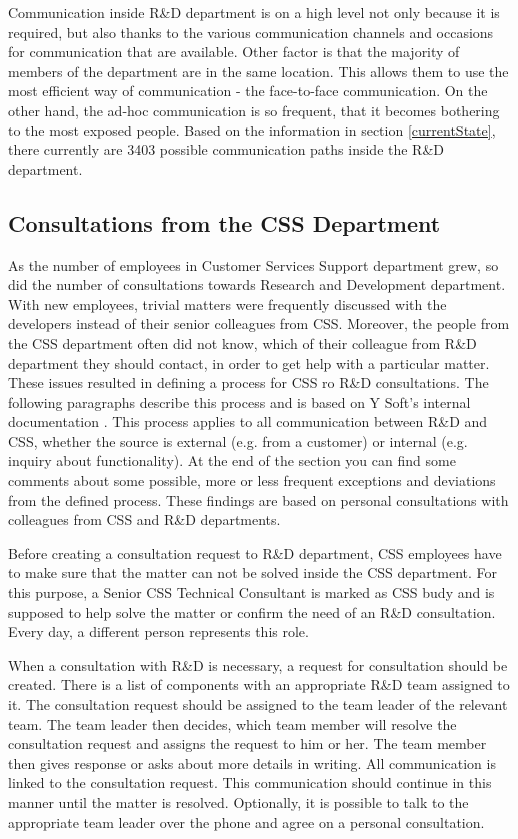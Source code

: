 \documentclass[11pt,singleside]{myfithesis2}
\begin{document}
Communication inside R\&D department is on a high level not only because it is required, but also thanks to the various communication channels and occasions for communication that are available. Other factor is that the majority of members of the department are in the same location. This allows them to use the most efficient way of communication - the face-to-face communication. On the other hand, the ad-hoc communication is so frequent, that it becomes bothering to the most exposed people. Based on the information in section \ref{currentState}, there currently are 3403 possible communication paths inside the R\&D department.
			
		\subsection{Consultations from the CSS Department}
As the number of employees in Customer Services Support department grew, so did the number of consultations towards Research and Development department. With new employees, trivial matters were frequently discussed with the developers instead of their senior colleagues from CSS. Moreover, the people from the CSS department often did not know, which of their colleague from R\&D department they should contact, in order to get help with a particular matter. These issues resulted in defining a process for CSS ro R\&D consultations. The following paragraphs describe this process and is based on Y Soft's internal documentation \cite{ysoftInternal}. This process applies to all communication between R\&D and CSS, whether the source is external (e.g. from a customer) or internal (e.g. inquiry about functionality). At the end of the section you can find some comments about some possible, more or less frequent exceptions and deviations from the defined process. These findings are based on personal consultations with colleagues from CSS and R\&D departments.

Before creating a consultation request to R\&D department, CSS employees have to make sure that the matter can not be solved inside the CSS department. For this purpose, a Senior CSS Technical Consultant is marked as CSS budy and is supposed to help solve the matter or confirm the need of an R\&D consultation. Every day, a different person represents this role.

When a consultation with R\&D is necessary, a request for consultation should be created. There is a list of components with an appropriate R\&D team assigned to it. The consultation request should be assigned to the team leader of the relevant team. The team leader then decides, which team member will resolve the consultation request and assigns the request to him or her. The team member then gives response or asks about more details in writing. All communication is linked to the consultation request. This communication should continue in this manner until the matter is resolved. Optionally, it is possible to talk to the appropriate team leader over the phone and agree on a personal consultation.
\end{document}
